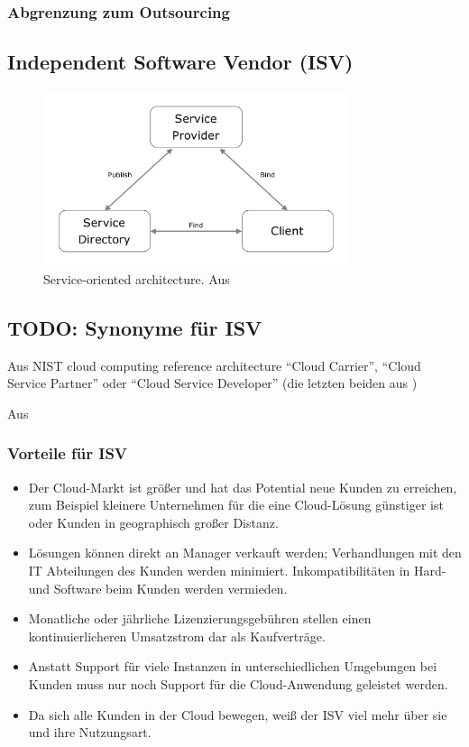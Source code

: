 \subsubsection{Abgrenzung zum Outsourcing}

\subsection{Independent Software Vendor (ISV)}
\label{cha:isv}

\begin{figure}[!h]
\begin{center}
\includegraphics[width=0.8\textwidth]{images/soa_architecture.png}
\caption{Service-oriented architecture. Aus 
\protect{}}
\label{fig:soa_architecture}
\end{center}
\end{figure}

\subsection{TODO: Synonyme für ISV}
Aus NIST cloud computing reference architecture "`Cloud Carrier"', 
"`Cloud Service Partner"' oder "`Cloud Service Developer"' (die letzten beiden 
aus )


Aus 
\subsubsection{Vorteile für ISV}
\begin{itemize}
	\item Der Cloud-Markt ist größer und hat das Potential neue Kunden zu
erreichen, zum Beispiel kleinere Unternehmen für die eine Cloud-Lösung
günstiger ist oder Kunden in geographisch großer Distanz.
	\item Lösungen können direkt an Manager verkauft werden; Verhandlungen
mit den IT Abteilungen des Kunden werden minimiert. Inkompatibilitäten in Hard-
und Software beim Kunden werden vermieden.
	\item Monatliche oder jährliche Lizenzierungsgebühren stellen einen
kontinuierlicheren Umsatzstrom dar als Kaufverträge.
	\item Anstatt Support für viele Instanzen in unterschiedlichen
Umgebungen bei Kunden muss nur noch Support für die Cloud-Anwendung
geleistet werden.
	\item Da sich alle Kunden in der Cloud bewegen, weiß der ISV viel mehr
über sie und ihre Nutzungsart.
\end{itemize}

